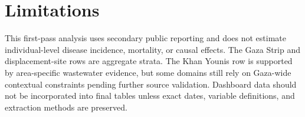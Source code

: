 \section{Limitations}

This first-pass analysis uses secondary public reporting and does not estimate individual-level disease incidence, mortality, or causal effects. The Gaza Strip and displacement-site rows are aggregate strata. The Khan Younis row is supported by area-specific wastewater evidence, but some domains still rely on Gaza-wide contextual constraints pending further source validation. Dashboard data should not be incorporated into final tables unless exact dates, variable definitions, and extraction methods are preserved.
